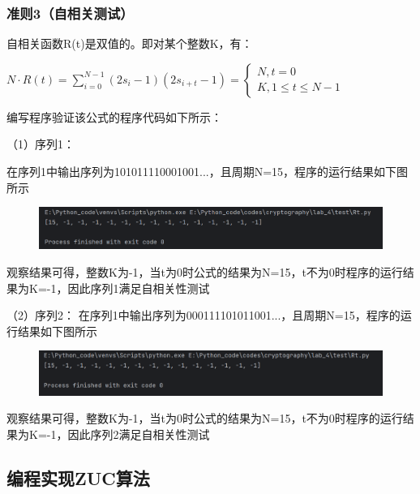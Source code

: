 \documentclass[a4paper,11pt,UTF8]{ctexart}
\newcommand{\bottomcaption}{%
\setlength{\abovecaptionskip}{6pt}%
\setlength{\belowcaptionskip}{6pt}%
\caption}
\newcommand{\xiaowuhao}{\fontsize{9pt}{\baselineskip}\selectfont}   %
\begin{document}
    \subsubsection{准则3（自相关测试）}
      自相关函数R(t)是双值的。即对某个整数K，有：\par
      $N\cdot R(t)=\sum_{i=0}^{N-1}(2s_{i}-1)(2s_{i+t}-1)=\left\{
        \begin{matrix} N,t=0\\K,1\le t\le N-1\end{matrix}\right. $\par
        编写程序验证该公式的程序代码如下所示：
        
      （1）序列1：\par
        在序列1中输出序列为101011110001001...，且周期N=15，程序的运行结果如下图所示
        \begin{figure}[H]
          \centering
          \includegraphics[width=13cm]{Rt_result1.png}
          \bottomcaption{\xiaowuhao{序列1验证结果}}
        \end{figure}
        观察结果可得，整数K为-1，当t为0时公式的结果为N=15，t不为0时程序的运行结果为K=-1，因此序列1满足自相关性测试
        
      （2）序列2：
        在序列1中输出序列为000111101011001...，且周期N=15，程序的运行结果如下图所示
          \begin{figure}[H]
            \centering
            \includegraphics[width=13cm]{Rt_result2.png}
            \bottomcaption{\xiaowuhao{序列2验证结果}}
          \end{figure}
          观察结果可得，整数K为-1，当t为0时公式的结果为N=15，t不为0时程序的运行结果为K=-1，因此序列2满足自相关性测试

  \subsection{编程实现ZUC算法}
\end{document}
